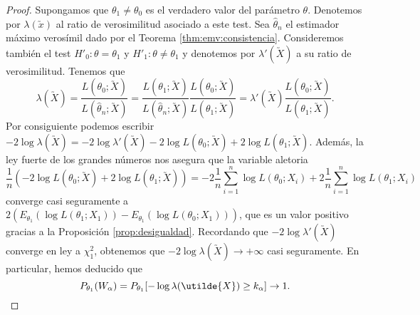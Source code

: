         \begin{proof}
            Supongamos que $\theta_1 \ne \theta_0$ es el verdadero valor del parámetro $\theta$. Denotemos por $\lambda(\utilde{x})$ al ratio de verosimilitud asociado a este test. Sea $\hat{\theta}_n$ el estimador máximo verosímil dado por el Teorema \ref{thm:emv:consistencia}.  Consideremos también el test $H'_0: \theta = \theta_1$ y $H'_1: \theta \ne \theta_1$ y denotemos por $\lambda'(\utilde{X})$ a su ratio de verosimilitud. Tenemos que
            \[\lambda(\utilde{X}) = \frac{L(\theta_0; \utilde{X})}{L(\hat{\theta}_n; \utilde{X})} = \frac{L(\theta_1; \utilde{X})}{L(\hat{\theta}_n; \utilde{X})} \frac{L(\theta_0; \utilde{X})}{L(\theta_1; \utilde{X})} = \lambda'(\utilde{X}) \frac{L(\theta_0; \utilde{X})}{L(\theta_1; \utilde{X})}.\]
            Por consiguiente podemos escribir $- 2 \log \lambda(\utilde{X}) = - 2 \log \lambda'(\utilde{X}) - 2 \log L(\theta_0; \utilde{X}) + 2 \log L(\theta_1; \utilde{X})$.  Además,  la ley fuerte de los grandes números nos asegura que la variable aletoria
            \[\frac{1}{n} \left(- 2\log L(\theta_0; \utilde{X}) + 2 \log L(\theta_1; \utilde{X})\right) = - 2 \frac{1}{n} \sum_{i = 1}^n \log L(\theta_0; X_i) + 2 \frac{1}{n} \sum_{i = 1}^n \log L(\theta_1; X_i)\]
            converge casi seguramente a $2(E_{\theta_1}(\log L(\theta_1; X_1)) - E_{\theta_1}(\log L(\theta_0; X_1)))$, que es un valor positivo gracias a la Proposición \ref{prop:desigualdad}. Recordando que $-2 \log \lambda'(\utilde{X})$ converge en ley a $\chi_1^2$, obtenemos que $- 2 \log \lambda(\utilde{X}) \to +\infty$ casi seguramente. En particular, hemos deducido que
            \[P_{\theta_1}(W_\alpha) = P_{\theta_1}[- \log \lambda(\utilde{X}) \ge k_\alpha] \to 1. \qedhere\]
        \end{proof}
